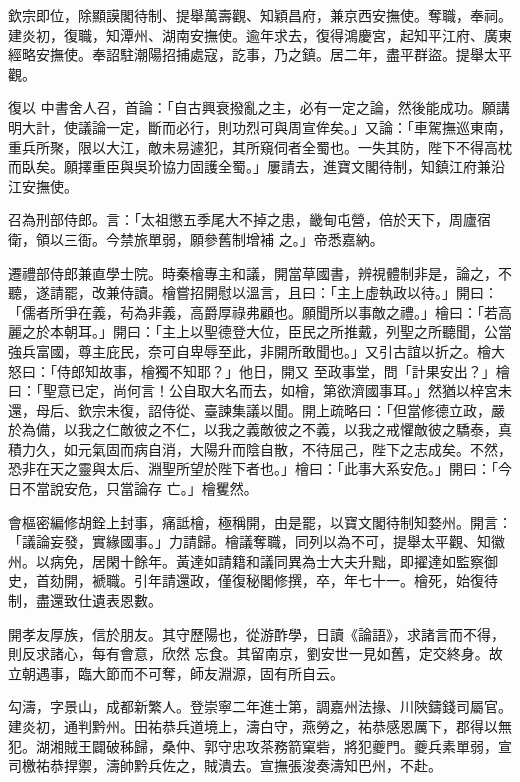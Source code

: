\begin{pinyinscope}
 欽宗即位，除顯謨閣待制、提舉萬壽觀、知穎昌府，兼京西安撫使。奪職，奉祠。建炎初，復職，知潭州、湖南安撫使。逾年求去，復得鴻慶宮，起知平江府、廣東經略安撫使。奉詔駐潮陽招捕處寇，訖事，乃之鎮。居二年，盡平群盜。提舉太平觀。



 復以
 中書舍人召，首論：「自古興衰撥亂之主，必有一定之論，然後能成功。願講明大計，使議論一定，斷而必行，則功烈可與周宣侔矣。」又論：「車駕撫巡東南，重兵所聚，限以大江，敵未易遽犯，其所窺伺者全蜀也。一失其防，陛下不得高枕而臥矣。願擇重臣與吳玠協力固護全蜀。」屢請去，進寶文閣待制，知鎮江府兼沿江安撫使。



 召為刑部侍郎。言：「太祖懲五季尾大不掉之患，畿甸屯營，倍於天下，周廬宿衛，領以三衙。今禁旅單弱，願參舊制增補
 之。」帝悉嘉納。



 遷禮部侍郎兼直學士院。時秦檜專主和議，開當草國書，辨視體制非是，論之，不聽，遂請罷，改兼侍讀。檜嘗招開慰以溫言，且曰：「主上虛執政以待。」開曰：「儒者所爭在義，茍為非義，高爵厚祿弗顧也。願聞所以事敵之禮。」檜曰：「若高麗之於本朝耳。」開曰：「主上以聖德登大位，臣民之所推戴，列聖之所聽聞，公當強兵富國，尊主庇民，奈可自卑辱至此，非開所敢聞也。」又引古誼以折之。檜大怒曰：「侍郎知故事，檜獨不知耶？」他日，開又
 至政事堂，問「計果安出？」檜曰：「聖意已定，尚何言！公自取大名而去，如檜，第欲濟國事耳。」然猶以梓宮未還，母后、欽宗未復，詔侍從、臺諫集議以聞。開上疏略曰：「但當修德立政，嚴於為備，以我之仁敵彼之不仁，以我之義敵彼之不義，以我之戒懼敵彼之驕泰，真積力久，如元氣固而病自消，大陽升而陰自散，不待屈己，陛下之志成矣。不然，恐非在天之靈與太后、淵聖所望於陛下者也。」檜曰：「此事大系安危。」開曰：「今日不當說安危，只當論存
 亡。」檜矍然。



 會樞密編修胡銓上封事，痛詆檜，極稱開，由是罷，以寶文閣待制知婺州。開言：「議論妄發，實緣國事。」力請歸。檜議奪職，同列以為不可，提舉太平觀、知徽州。以病免，居閑十餘年。黃達如請籍和議同異為士大夫升黜，即擢達如監察御史，首劾開，褫職。引年請還政，僅復秘閣修撰，卒，年七十一。檜死，始復待制，盡還致仕遺表恩數。



 開孝友厚族，信於朋友。其守歷陽也，從游酢學，日讀《論語》，求諸言而不得，則反求諸心，每有會意，欣然
 忘食。其留南京，劉安世一見如舊，定交終身。故立朝遇事，臨大節而不可奪，師友淵源，固有所自云。



 勾濤，字景山，成都新繁人。登崇寧二年進士第，調嘉州法掾、川陜鑄錢司屬官。建炎初，通判黔州。田祐恭兵道境上，濤白守，燕勞之，祐恭感恩厲下，郡得以無犯。湖湘賊王闢破秭歸，桑仲、郭守忠攻茶務箭窠砦，將犯夔門。夔兵素單弱，宣司檄祐恭捍禦，濤帥黔兵佐之，賊潰去。宣撫張浚奏濤知巴州，不赴。




\end{pinyinscope}

